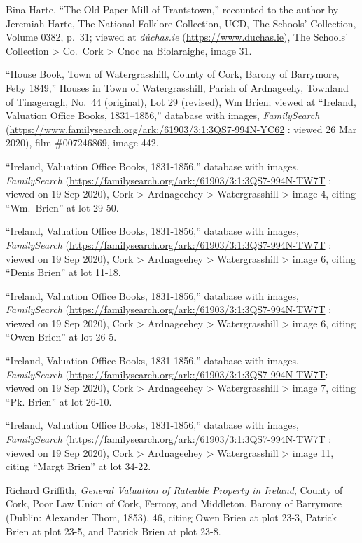 \begin{thebibliography}{999}
Bina Harte, ``The Old Paper Mill of Trantstown,'' recounted to the author by Jeremiah Harte, The National Folklore Collection, UCD, The Schools' Collection, Volume 0382, p.\ 31; viewed at \textit{d\'{u}chas.ie} (\url{https://www.duchas.ie}), The Schools' Collection > Co.\ Cork > Cnoc na Biolaraighe, image 31.

``House Book, Town of Watergrasshill, County of Cork, Barony of Barrymore, Feby 1849,'' Houses in Town of Watergrasshill, Parish of Ardnageehy, Townland of Tinageragh, No.\ 44 (original), Lot 29 (revised), Wm Brien; viewed at ``Ireland, Valuation Office Books, 1831--1856,'' database with images, \textit{FamilySearch} (\url{https://www.familysearch.org/ark:/61903/3:1:3QS7-994N-YC62} : viewed 26 Mar 2020), film \#007246869, image 442.
	
``Ireland, Valuation Office Books, 1831-1856,'' database with images, \textit{FamilySearch} (\url{https://familysearch.org/ark:/61903/3:1:3QS7-994N-TW7T} : viewed on 19 Sep 2020), Cork > Ardnageehey > Watergrasshill > image 4, citing ``Wm.\ Brien'' at lot 29-50.
	
``Ireland, Valuation Office Books, 1831-1856,'' database with images, \textit{FamilySearch} (\url{https://familysearch.org/ark:/61903/3:1:3QS7-994N-TW7T} : viewed on 19 Sep 2020), Cork > Ardnageehey > Watergrasshill > image 6, citing ``Denis Brien'' at lot 11-18.
	
``Ireland, Valuation Office Books, 1831-1856,'' database with images, \textit{FamilySearch} (\url{https://familysearch.org/ark:/61903/3:1:3QS7-994N-TW7T} : viewed on 19 Sep 2020), Cork > Ardnageehey > Watergrasshill > image 6, citing ``Owen Brien'' at lot 26-5.
	
``Ireland, Valuation Office Books, 1831-1856,'' database with images, \textit{FamilySearch} (\url{https://familysearch.org/ark:/61903/3:1:3QS7-994N-TW7T}: viewed on 19 Sep 2020), Cork > Ardnageehey > Watergrasshill > image 7, citing ``Pk. Brien'' at lot 26-10.
	
``Ireland, Valuation Office Books, 1831-1856,'' database with images, \textit{FamilySearch} (\url{https://familysearch.org/ark:/61903/3:1:3QS7-994N-TW7T} : viewed on 19 Sep 2020), Cork > Ardnageehey > Watergrasshill > image 11, citing ``Margt Brien'' at lot 34-22.
	
Richard Griffith, \textit{General Valuation of Rateable Property in Ireland}, County of Cork, Poor Law Union of Cork, Fermoy, and Middleton, Barony of Barrymore (Dublin: Alexander Thom, 1853), 46, citing Owen Brien at plot 23-3, Patrick Brien at plot 23-5, and Patrick Brien at plot 23-8.


\end{thebibliography}
